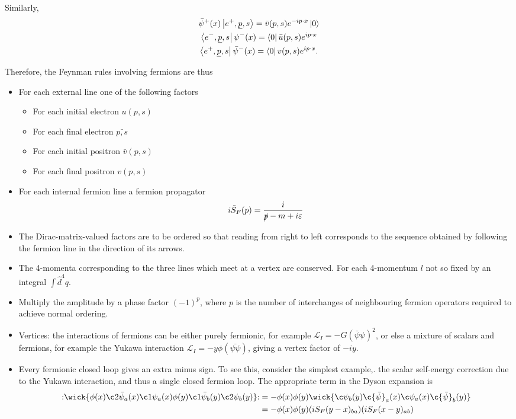 \documentclass{article}
\numberwithin{equation}{section}
\newcommand{\normord}[1]{:\mathrel{#1}:}
\begin{document}
Similarly,
\begin{gather}
    \bar{\psi}^+(x)\ket{e^+, \underline{p}, s} = \bar{v}(p, s) e^{-ip\cdot x}\ket{0}\\
    \bra{e^-, \underline{p}, s}\psi^-(x) = \bra{0}\bar{u}(p, s)e^{ip\cdot x} \\
    \bra{e^+, \underline{p}, s}\bar{\psi}^-(x) = \bra{0} v(p, s)e^{ip\cdot x}.
\end{gather}

Therefore, the Feynman rules involving fermions are thus 
\begin{itemize}
    \item For each external line one of the following factors
    \begin{itemize}
        \item For each initial electron $u(p, s)$
        \item For each final electron $\bar{p, s}$
        \item For each initial positron $\bar{v}(p, s)$
        \item For each final positron $v(p, s)$
    \end{itemize}
    \item For each internal fermion line a fermion propagator
    \begin{equation}
        i\tilde{S}_F(p) = \frac{i}{\slashed{p} - m + i\varepsilon} 
    \end{equation}
    \item The Dirac-matrix-valued factors are to be ordered so that reading from right to left corresponds to the sequence obtained by following the fermion line in the direction of its arrows.
    \item The 4-momenta corresponding to the three lines which meet at a vertex are conserved. For each 4-momentum $l$ not so fixed by an integral $\int \hat{d}^4q$.
    \item Multiply the amplitude by a phase factor $(-1)^p$, where $p$ is the number of interchanges of neighbouring fermion operators required to achieve normal ordering. 
    \item Vertices: the interactions of fermions can be either purely fermionic, for example $\mathcal{L}_I = -G(\bar{\psi}\psi)^2$, or else a mixture of scalars and fermions, for example the Yukawa interaction $\mathcal{L}_I = -y\phi(\bar{\psi \psi})$, giving a vertex factor of $-iy$. 
    \item Every fermionic closed loop gives an extra minus sign. To see this, consider the simplest example,. the scalar self-energy correction due to the Yukawa interaction, and thus a single closed fermion loop. The appropriate term in the Dyson expansion is
    \begin{equation}
    \begin{aligned}
        \normord{\wick{\phi(x)\c2{\bar{\psi}}_a(x) \c1{\psi}_a(x) \phi(y) \c1{\bar{\psi}}_b(y) \c2{\psi}_b(y) }} &= -\phi(x)\phi(y)\wick{\c\psi_b(y) \c{\bar{\psi}}_a(x) \c\psi_a(x) \c{\bar{\psi}}_b(y)}\\
        &= - \phi(x) \phi(y) (iS_F(y-x)_{ba}) (iS_F(x-y)_{ab})
    \end{aligned}
    \end{equation}
\end{itemize}
\end{document}
